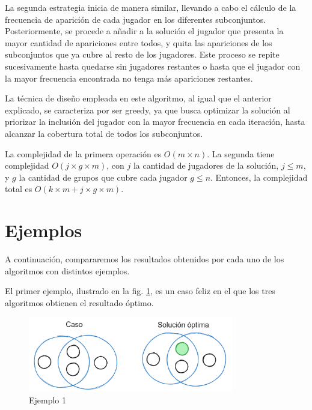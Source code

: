 La segunda estrategia inicia de manera similar, llevando a cabo el cálculo de la frecuencia de aparición de cada jugador en los diferentes subconjuntos. Posteriormente, se procede a añadir a la solución el jugador que presenta la mayor cantidad de apariciones entre todos, y quita las apariciones de los subconjuntos que ya cubre al resto de los jugadores. Este proceso se repite sucesivamente hasta quedarse sin jugadores restantes o hasta que el jugador con la mayor frecuencia encontrada no tenga más apariciones restantes.

La técnica de diseño empleada en este algoritmo, al igual que el anterior explicado, se caracteriza por ser greedy, ya que busca optimizar la solución al priorizar la inclusión del jugador con la mayor frecuencia en cada iteración, hasta alcanzar la cobertura total de todos los subconjuntos. 



La complejidad de la primera operación es $O(m \times n)$. La segunda tiene complejidad $O(j \times g \times m)$, con $j$ la cantidad de jugadores de la solución, $j \leq m$, y $g$ la cantidad de grupos que cubre cada jugador $g \leq n$. Entonces, la complejidad total es $O(k \times m + j \times g \times m)$. 

\section{Ejemplos}

A continuación, compararemos los resultados obtenidos por cada uno de los algoritmos con distintos ejemplos.

El primer ejemplo, ilustrado en la fig. \ref{fig:greedy_ej1}, es un caso feliz en el que los tres algoritmos obtienen el resultado óptimo.

\begin{figure}[H]
    \centering
    \includegraphics[width=0.8\textwidth]{img/greedy_ej1.png}
    \caption{Ejemplo 1}
    \label{fig:greedy_ej1}
\end{figure}

